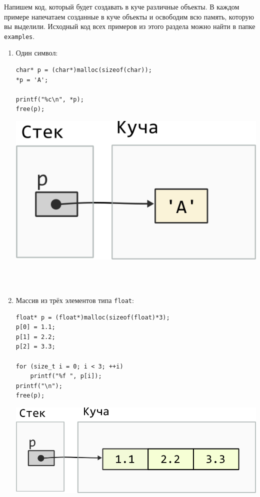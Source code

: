 \documentclass[10pt]{article}
\begin{document}
Напишем код, который будет создавать в куче различные объекты. В каждом примере напечатаем созданные в куче объекты и освободим всю память, которую вы выделили. Исходный код всех примеров из этого раздела можно найти в папке \texttt{examples}.
\begin{enumerate}


\item Один символ:\\
\noindent\begin{minipage}{.50\textwidth}
\begin{lstlisting}[style=boxStyle]
char* p = (char*)malloc(sizeof(char));
*p = 'A';

printf("%c\n", *p);
free(p);
\end{lstlisting}
\end{minipage}\hfill
\begin{minipage}{.40\textwidth}
\includegraphics[scale=0.7]{../images/malloc_class_tasks/heap_char.png}
\end{minipage}
\quad\\
\quad\\


\item Массив из трёх элементов типа \texttt{float}:\\
\noindent\begin{minipage}{.50\textwidth}
\begin{lstlisting}[style=boxStyle]
float* p = (float*)malloc(sizeof(float)*3);
p[0] = 1.1;
p[1] = 2.2;
p[2] = 3.3;

for (size_t i = 0; i < 3; ++i)
    printf("%f ", p[i]);
printf("\n");
free(p);
\end{lstlisting}
\end{minipage}\hfill
\begin{minipage}{.4\textwidth}
\includegraphics[scale=0.7]{../images/malloc_class_tasks/heap_double_array.png}
\end{minipage}
\quad\\
\quad\\



\end{enumerate}
\end{document}
